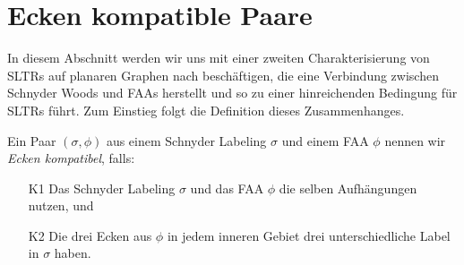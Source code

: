 \section{Ecken kompatible Paare}

In diesem Abschnitt werden wir uns mit einer zweiten Charakterisierung von SLTRs auf planaren Graphen nach \cite{af15} beschäftigen, die eine Verbindung zwischen Schnyder Woods und FAAs herstellt und so zu einer hinreichenden Bedingung für SLTRs führt. Zum Einstieg folgt die Definition dieses Zusammenhanges.

\begin{definition}\label{def_ccc}
Ein Paar $(\sigma,\phi)$ aus einem Schnyder Labeling $\sigma$ und einem FAA $\phi$ nennen wir \textit{Ecken kompatibel}, falls:
\begin{itemize}
\item [K1] Das Schnyder Labeling $\sigma$ und das FAA $\phi$ die selben Aufhängungen nutzen, und
\item [K2] Die drei Ecken aus $\phi$ in jedem inneren Gebiet drei unterschiedliche Label in $\sigma$ haben.
\end{itemize}
\end{definition}

